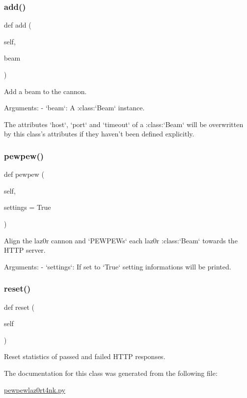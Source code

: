 \subsubsection{\texorpdfstring{add()}{add()}}
{\footnotesize\ttfamily def add (\begin{DoxyParamCaption}\item[{}]{self,  }\item[{}]{beam }\end{DoxyParamCaption})}

\begin{DoxyVerb}Add a beam to the cannon.

Arguments:
    - `beam`: A :class:`Beam` instance.

The attributes `host`, `port` and `timeout` of a :class:`Beam`
will be overwritten by this class's attributes if they haven't
been defined explicitly.
\end{DoxyVerb}
 \mbox{\label{classpewpewlaz0rt4nk_1_1_laz0r_cannon_a602db2841c236b79433716f61c5e2d01}} 
\subsubsection{\texorpdfstring{pewpew()}{pewpew()}}
{\footnotesize\ttfamily def pewpew (\begin{DoxyParamCaption}\item[{}]{self,  }\item[{}]{settings = {\ttfamily True} }\end{DoxyParamCaption})}

\begin{DoxyVerb}Align the laz0r cannon and `PEWPEWs` each laz0r :class:`Beam`
towards the HTTP server.

Arguments:
    - `settings`: If set to `True` setting informations will be
      printed.
\end{DoxyVerb}
 \mbox{\label{classpewpewlaz0rt4nk_1_1_laz0r_cannon_a51829b63adb24ac48d350dee60181002}} 
\subsubsection{\texorpdfstring{reset()}{reset()}}
{\footnotesize\ttfamily def reset (\begin{DoxyParamCaption}\item[{}]{self }\end{DoxyParamCaption})}

\begin{DoxyVerb}Reset statistics of passed and failed HTTP responses.\end{DoxyVerb}
 

The documentation for this class was generated from the following file\+:\begin{DoxyCompactItemize}
\item 
\hyperlink{pewpewlaz0rt4nk_8py}{pewpewlaz0rt4nk.\+py}\end{DoxyCompactItemize}
